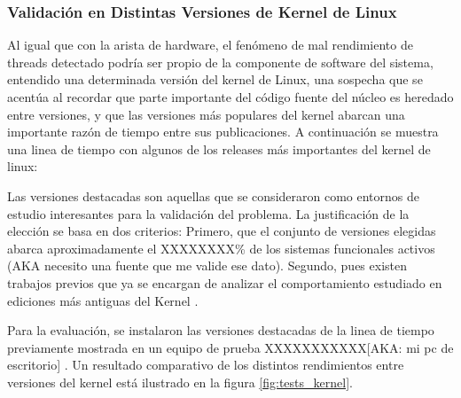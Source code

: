 \subsubsection{Validación en Distintas Versiones de Kernel de Linux}

Al igual que con la arista de hardware, el fenómeno de mal rendimiento de threads detectado podría ser propio de la componente de software del sistema, entendido  una determinada versión del kernel de Linux, una sospecha que se acentúa al recordar que parte importante del código fuente del núcleo es heredado entre versiones, y que las versiones más populares del kernel abarcan una importante razón de tiempo entre sus publicaciones. A continuación se muestra una linea de tiempo con algunos de los releases más importantes del kernel de linux:

\begin{center}
\end{center}

Las versiones destacadas son aquellas que se consideraron como entornos de estudio interesantes para la validación del problema. La justificación de la elección se basa en dos criterios: Primero, que el conjunto de versiones elegidas abarca aproximadamente el XXXXXXXX\% de los sistemas funcionales activos (AKA necesito una fuente que me valide ese dato). Segundo, pues existen trabajos previos que ya se encargan de analizar el comportamiento estudiado en ediciones más antiguas del Kernel \cite{tesis:diegoDCC}.

Para la evaluación, se instalaron las versiones destacadas de la linea de tiempo previamente mostrada en un equipo de prueba XXXXXXXXXXX[AKA: mi pc de escritorio] . Un resultado comparativo de los distintos rendimientos entre versiones del kernel está ilustrado en la figura \ref{fig:tests_kernel}.

